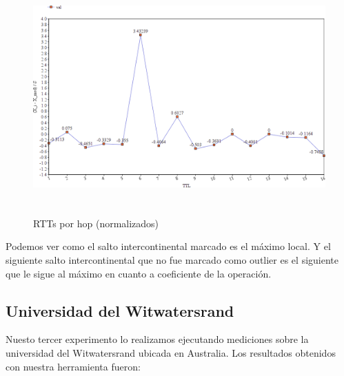 \documentclass[a4paper,10pt]{article}
\begin{document}
\medskip
\begin{figure}[H]
    \centering
    \includegraphics[height=9cm]{imagenes/uniCanada.png}
    \caption{RTTs por hop (normalizados)}
\end{figure}

\medskip
\par{Podemos ver como el salto intercontinental marcado es el máximo local. Y el siguiente salto intercontinental que no fue marcado como outlier es el siguiente que le sigue al  máximo en cuanto a coeficiente de la operación.}



\medskip
\medskip
\medskip

\subsection{Universidad del Witwatersrand}

\medskip
\par{Nuesto tercer experimento lo realizamos ejecutando mediciones sobre la universidad del Witwatersrand ubicada en Australia. Los resultados obtenidos con nuestra herramienta fueron: }

\medskip
\end{document}
